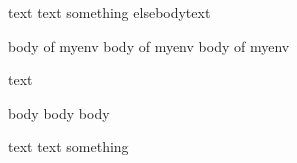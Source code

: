 text text
\if something \else elsebody\fi text
\begin{myenv}
	body of myenv
	body of myenv
	body of myenv
\end{myenv}

text

\begin{anotherenv}
	body
	body
	body
\end{anotherenv}

text text
\if something \fi